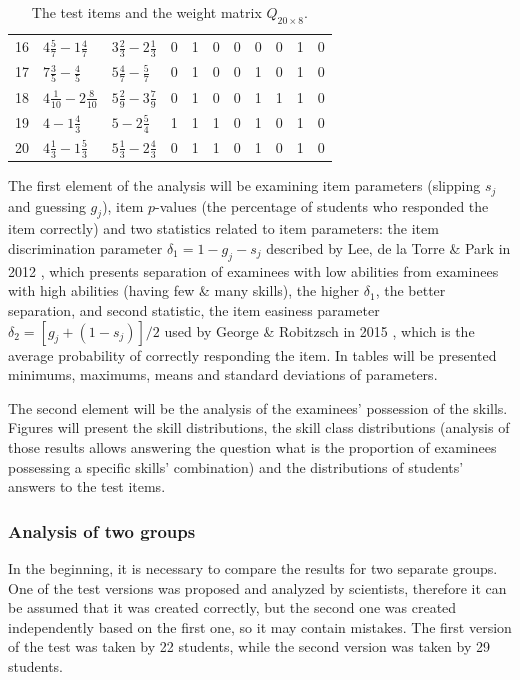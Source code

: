 \documentclass[english]{pwr_wmat_praca_dyplomowa}
\theoremstyle{plain}
\theoremstyle{definition}
\numberwithin{theorem}{chapter}
\begin{document}
\begin{table}[H]
\begin{tabular}{l l l c c c c c c c c}
		16 & $4\frac{5}{7} - 1\frac{4}{7}$ & $3\frac{2}{3} - 2\frac{1}{3}$ & 0 & 1 & 0 & 0 & 0 & 0 & 1 & 0 \\ [1ex]
		17 & $7\frac{3}{5} - \frac{4}{5}$ & $5\frac{4}{7} - \frac{5}{7}$ & 0 & 1 & 0 & 0 & 1 & 0 & 1 & 0 \\ [1ex]
		18 & $4\frac{1}{10} - 2\frac{8}{10}$ & $5\frac{2}{9} - 3\frac{7}{9}$ & 0 & 1 & 0 & 0 & 1 & 1 & 1 & 0 \\ [1ex]
		19 & $4 - 1\frac{4}{3}$ & $5 - 2\frac{5}{4}$ & 1 & 1 & 1 & 0 & 1 & 0 & 1 & 0 \\ [1ex]
		20 & $4\frac{1}{3} - 1\frac{5}{3}$ & $5\frac{1}{3} - 2\frac{4}{3}$ & 0 & 1 & 1 & 0 & 1 & 0 & 1 &0\\[0.5ex] 
		\hline
	\end{tabular}
	\caption{The test items and the weight matrix $Q_{20 \times 8}$.}
	\label{tab:qmatrix_real} 
\end{table}

The first element of the analysis will be examining item parameters (slipping $s_j$ and guessing $g_j$), item $p$-values (the percentage of students who responded the item correctly) and two statistics related to item parameters: the item discrimination parameter $\delta_1 = 1 - g_j - s_j$ described by Lee, de la Torre \& Park in 2012 \cite{item_discrimination}, which presents separation of examinees with low abilities from examinees with high abilities (having few \& many skills), the higher $\delta_1$, the better separation, and second statistic, the item easiness parameter $\delta_2 = [g_j + (1-s_j)]/2$ used by George \& Robitzsch in 2015 \cite{cdm_in_r}, which is the average probability of correctly responding the item. In tables will be presented minimums, maximums, means and standard deviations of parameters. 

The second element will be the analysis of the examinees' possession of the skills. Figures will present the skill distributions, the skill class distributions (analysis of those results allows answering the question what is the proportion of examinees possessing a specific skills' combination) and the distributions of students' answers to the test items. 

\subsubsection{Analysis of two groups}

In the beginning, it is necessary to compare the results for two separate groups. One of the test versions was proposed and analyzed by scientists, therefore it can be assumed that it was created correctly, but the second one was created independently based on the first one, so it may contain mistakes. The first version of the test was taken by 22 students, while the second version was taken by 29 students. 
\end{document}

